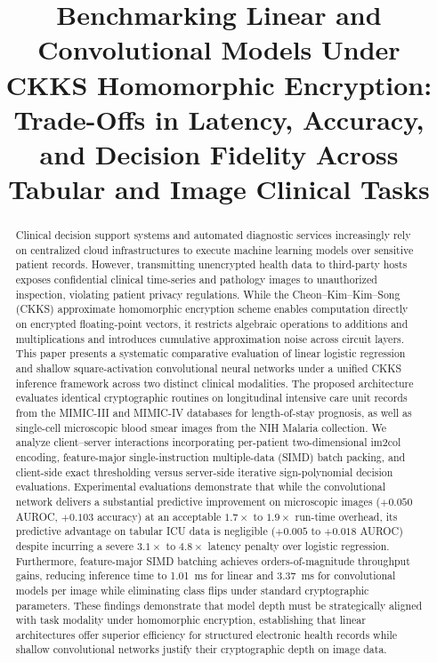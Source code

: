 \documentclass[conference]{IEEEtran}
\begin{document}
\title{Benchmarking Linear and Convolutional Models Under CKKS Homomorphic Encryption: Trade-Offs in Latency, Accuracy, and Decision Fidelity Across Tabular and Image Clinical Tasks}

\author{
}

\maketitle

\begin{abstract}
Clinical decision support systems and automated diagnostic services increasingly rely on centralized cloud infrastructures to execute machine learning models over sensitive patient records. However, transmitting unencrypted health data to third-party hosts exposes confidential clinical time-series and pathology images to unauthorized inspection, violating patient privacy regulations. While the Cheon--Kim--Kim--Song (CKKS) approximate homomorphic encryption scheme enables computation directly on encrypted floating-point vectors, it restricts algebraic operations to additions and multiplications and introduces cumulative approximation noise across circuit layers. This paper presents a systematic comparative evaluation of linear logistic regression and shallow square-activation convolutional neural networks under a unified CKKS inference framework across two distinct clinical modalities. The proposed architecture evaluates identical cryptographic routines on longitudinal intensive care unit records from the MIMIC-III and MIMIC-IV databases for length-of-stay prognosis, as well as single-cell microscopic blood smear images from the NIH Malaria collection. We analyze client--server interactions incorporating per-patient two-dimensional im2col encoding, feature-major single-instruction multiple-data (SIMD) batch packing, and client-side exact thresholding versus server-side iterative sign-polynomial decision evaluations. Experimental evaluations demonstrate that while the convolutional network delivers a substantial predictive improvement on microscopic images ($+0.050$ AUROC, $+0.103$ accuracy) at an acceptable $1.7\times$ to $1.9\times$ run-time overhead, its predictive advantage on tabular ICU data is negligible ($+0.005$ to $+0.018$ AUROC) despite incurring a severe $3.1\times$ to $4.8\times$ latency penalty over logistic regression. Furthermore, feature-major SIMD batching achieves orders-of-magnitude throughput gains, reducing inference time to 1.01~ms for linear and 3.37~ms for convolutional models per image while eliminating class flips under standard cryptographic parameters. These findings demonstrate that model depth must be strategically aligned with task modality under homomorphic encryption, establishing that linear architectures offer superior efficiency for structured electronic health records while shallow convolutional networks justify their cryptographic depth on image data.

\end{abstract}
\end{document}
